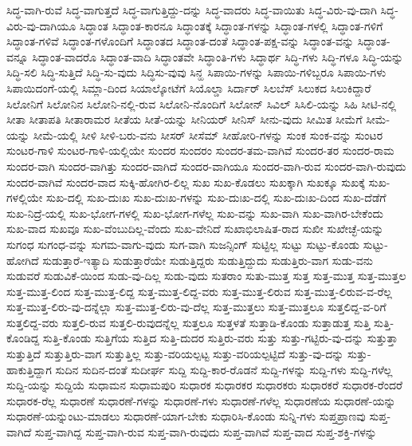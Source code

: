 {ಸಿದ್ಧ-ವಾಗಿ-ರುವೆ
ಸಿದ್ಧ-ವಾಗುತ್ತದೆ
ಸಿದ್ಧ-ವಾಗುತ್ತಿದ್ದು-ದನ್ನು
ಸಿದ್ಧ-ವಾದರು
ಸಿದ್ಧ-ವಾಯಿತು
ಸಿದ್ಧ-ವಿರು-ವು-ದಾಗಿ
ಸಿದ್ಧ-ವಿರು-ವು-ದಾಗಿಯೂ
ಸಿದ್ಧಾಂತ
ಸಿದ್ಧಾಂತ-ಕಾರನೂ
ಸಿದ್ಧಾಂತಕ್ಕೆ
ಸಿದ್ಧಾಂತ-ಗಳನ್ನು
ಸಿದ್ಧಾಂತ-ಗಳಲ್ಲಿ
ಸಿದ್ಧಾಂತ-ಗಳಿಗೆ
ಸಿದ್ಧಾಂತ-ಗಳಿವೆ
ಸಿದ್ಧಾಂತ-ಗಳೊಂದಿಗೆ
ಸಿದ್ಧಾಂತದ
ಸಿದ್ಧಾಂತ-ದಂತೆ
ಸಿದ್ಧಾಂತ-ಪಕ್ಷ-ವನ್ನು
ಸಿದ್ಧಾಂತ-ವನ್ನು
ಸಿದ್ಧಾಂತ-ವನ್ನೂ
ಸಿದ್ಧಾಂತ-ವಾದರೊ
ಸಿದ್ಧಾಂತ-ವಾದಿ
ಸಿದ್ಧಾಂತವೇ
ಸಿದ್ಧಾಂತಿ-ಗಳು
ಸಿದ್ಧಾರ್ಥ
ಸಿದ್ಧಿ-ಗಳು
ಸಿದ್ಧಿ-ಗಳೂ
ಸಿದ್ಧಿ-ಯನ್ನು
ಸಿದ್ಧಿ-ಸಲಿ
ಸಿದ್ಧಿ-ಸುತ್ತಿದೆ
ಸಿದ್ಧಿ-ಸು-ವುದು
ಸಿದ್ಧಿಸು-ವುವು
ಸಿನ್ಹ
ಸಿಪಾಯಿ-ಗಳನ್ನು
ಸಿಪಾಯಿ-ಗಳಿಬ್ಬರೂ
ಸಿಪಾಯಿ-ಗಳು
ಸಿಪಾಯಿದಂಗೆ-ಯಲ್ಲಿ
ಸಿಮ್ಲಾ-ದಿಂದ
ಸಿಯಾಲ್ಕೋಟೆಗೆ
ಸಿಯೊಲ್ಡಾ
ಸಿರ್ದಾರ್
ಸಿಲಬೆಸ್
ಸಿಲುಕದ
ಸಿಲುಕಿದ್ದಾರೆ
ಸಿಲೋನಿಗೆ
ಸಿಲೋನಿನ
ಸಿಲೋನಿ-ನಲ್ಲಿ-ರುವ
ಸಿಲೋನಿ-ನೊಂದಿಗೆ
ಸಿಲೋನ್
ಸಿವಿಲ್
ಸಿಸಿಲಿ-ಯನ್ನು
ಸಿಹಿ
ಸೀಟಿ-ನಲ್ಲಿ
ಸೀತಾ
ಸೀತಾಪತಿ
ಸೀತಾರಾಮರ
ಸೀತೆಯ
ಸೀತೆ-ಯನ್ನು
ಸೀನಿಯರ್
ಸೀನಿಸ್
ಸೀನು-ವುದು
ಸೀಮಿತ
ಸೀಮೆಗೆ
ಸೀಮೆ-ಯನ್ನು
ಸೀಮೆ-ಯಲ್ಲಿ
ಸೀಳಿ
ಸೀಳಿ-ಬರು-ವನು
ಸೀಸರ್
ಸೀಸೆಮ್
ಸೀಹೋರಿ-ಗಳನ್ನು
ಸುಂಕ
ಸುಂಕ-ವನ್ನು
ಸುಂಟರ
ಸುಂಟರ-ಗಾಳಿ
ಸುಂಟರ-ಗಾಳಿ-ಯಲ್ಲಿಯೇ
ಸುಂದರ
ಸುಂದರಂ
ಸುಂದರ-ತಮ-ವಾಗಿವೆ
ಸುಂದರ-ತರ
ಸುಂದರ-ರಾಮ
ಸುಂದರ-ವಾಗಿ
ಸುಂದರ-ವಾಗಿತ್ತು
ಸುಂದರ-ವಾಗಿದೆ
ಸುಂದರ-ವಾಗಿಯೂ
ಸುಂದರ-ವಾಗಿ-ರುವ
ಸುಂದರ-ವಾಗಿ-ರುವುದು
ಸುಂದರ-ವಾಗಿವೆ
ಸುಂದರ-ವಾದ
ಸುಕ್ಕಿ-ಹೋಗಿರ-ಲಿಲ್ಲ
ಸುಖ
ಸುಖ-ಕೊಡಲು
ಸುಖಕ್ಕಾಗಿ
ಸುಖಕ್ಕೂ
ಸುಖಕ್ಕೆ
ಸುಖ-ಗಳಲ್ಲಿಯೇ
ಸುಖ-ದಲ್ಲಿ
ಸುಖ-ದುಃಖ
ಸುಖ-ದುಃಖ-ಗಳನ್ನು
ಸುಖ-ದುಃಖ-ದಲ್ಲಿ
ಸುಖ-ದುಃಖ-ದಿಂದ
ಸುಖ-ದೆಡೆಗೆ
ಸುಖ-ನಿದ್ರೆ-ಯಲ್ಲಿ
ಸುಖ-ಭೋಗ-ಗಳಲ್ಲಿ
ಸುಖ-ಭೋಗ-ಗಳೆಲ್ಲ
ಸುಖ-ವನ್ನು
ಸುಖ-ವಾಗಿ
ಸುಖ-ವಾಗಿರ-ಬೇಕೆಂದು
ಸುಖ-ವಾದ
ಸುಖವೂ
ಸುಖ-ವೆಂಬುದಿಲ್ಲ-ವೆಂದು
ಸುಖ-ವೇನಿದೆ
ಸುಖಾಭಿಲಾಷಿತ-ರಾದ
ಸುಖೀ
ಸುಖೇಚ್ಛೆ-ಯನ್ನು
ಸುಗಂಧ
ಸುಗಂಧ-ವನ್ನು
ಸುಗಮ-ವಾಗು-ವುದು
ಸುಗ-ವಾಗಿ
ಸುಜನ್ಸಿಂಗ್
ಸುಟ್ಟಿಲ್ಲ
ಸುಟ್ಟು
ಸುಟ್ಟು-ಕೊಂಡು
ಸುಟ್ಟು-ಹೋಗಿದೆ
ಸುಡುತ್ತಾರೆ-ಇತ್ಯಾದಿ
ಸುಡುತ್ತಾರೆಯೇ
ಸುಡುತ್ತಿದ್ದರು
ಸುಡುತ್ತಿದ್ದುದು
ಸುಡುತ್ತಿರು-ವಾಗ
ಸುಡು-ವನು
ಸುಡುವರೆ
ಸುಡುವಿಕೆ-ಯಿಂದ
ಸುಡು-ವು-ದಿಲ್ಲ
ಸುಡು-ವುದು
ಸುತರಾಂ
ಸುತು-ಮುತ್ತ
ಸುತ್ತ
ಸುತ್ತ-ಮುತ್ತ
ಸುತ್ತ-ಮುತ್ತಲ
ಸುತ್ತ-ಮುತ್ತ-ಲಿಂದ
ಸುತ್ತ-ಮುತ್ತ-ಲಿದ್ದ
ಸುತ್ತ-ಮುತ್ತ-ಲಿದ್ದ-ವರು
ಸುತ್ತ-ಮುತ್ತ-ಲಿರುವ
ಸುತ್ತ-ಮುತ್ತ-ಲಿರುವ-ವ-ರೆಲ್ಲ
ಸುತ್ತ-ಮುತ್ತ-ಲಿರು-ವು-ದನ್ನೆಲ್ಲಾ
ಸುತ್ತ-ಮುತ್ತ-ಲಿರು-ವು-ದೆಲ್ಲ
ಸುತ್ತ-ಮುತ್ತಲು
ಸುತ್ತ-ಮುತ್ತಲೂ
ಸುತ್ತಲಿದ್ದ-ವ-ರಿಗೆ
ಸುತ್ತಲಿದ್ದ-ವರು
ಸುತ್ತಲಿ-ರುವ
ಸುತ್ತಲಿ-ರುವುದನ್ನೆಲ್ಲ
ಸುತ್ತಲೂ
ಸುತ್ತಳತೆ
ಸುತ್ತಾಡಿ-ಕೊಂಡು
ಸುತ್ತಾಡುತ್ತ
ಸುತ್ತಿ
ಸುತ್ತಿ-ಕೊಂಡಿದ್ದ
ಸುತ್ತಿ-ಕೊಂಡು
ಸುತ್ತಿಗೆಯ
ಸುತ್ತಿದ
ಸುತ್ತಿ-ದುದರ
ಸುತ್ತಿರು-ವರು
ಸುತ್ತು
ಸುತ್ತು-ಗಟ್ಟಿರು-ವು-ದನ್ನು
ಸುತ್ತುತ್ತಾ
ಸುತ್ತುತ್ತಿದೆ
ಸುತ್ತುತ್ತಿರು-ವಾಗ
ಸುತ್ತುತ್ತಿಲ್ಲ
ಸುತ್ತು-ವರಿಯಲ್ಪಟ್ಟ
ಸುತ್ತು-ವರಿಯಲ್ಪಟ್ಟಿದೆ
ಸುತ್ತು-ವು-ದನ್ನು
ಸುತ್ತು-ಹಾಕುತ್ತಿದ್ದಾಗ
ಸುದಿನ
ಸುದಿನ-ದಂತೆ
ಸುದೀರ್ಘ
ಸುದ್ದಿ
ಸುದ್ದಿ-ಕಾರ-ರೊಡನೆ
ಸುದ್ದಿ-ಗಳನ್ನು
ಸುದ್ದಿ-ಗಳು
ಸುದ್ದಿ-ಗಳೆಲ್ಲ
ಸುದ್ದಿ-ಯನ್ನು
ಸುದ್ದಿಯೆ
ಸುಧಾಮನ
ಸುಧಾಮಪುರಿ
ಸುಧಾರಕ
ಸುಧಾರಕರ
ಸುಧಾರಕರು
ಸುಧಾರಕರೆ
ಸುಧಾರಕ-ರೆಂದರೆ
ಸುಧಾರಕ-ರೆಲ್ಲ
ಸುಧಾರಣೆ
ಸುಧಾರಣೆ-ಗಳನ್ನು
ಸುಧಾರಣೆ-ಗಳು
ಸುಧಾರಣೆ-ಗಳೆಲ್ಲ
ಸುಧಾರಣೆಯ
ಸುಧಾರಣೆ-ಯನ್ನು
ಸುಧಾರಣೆ-ಯನ್ನುಂಟು-ಮಾಡಲು
ಸುಧಾರಣೆ-ಯಾಗ-ಬೇಕು
ಸುಧಾರಿಸಿ-ಕೊಂಡು
ಸುನ್ನಿ-ಗಳು
ಸುಪ್ತಪ್ರಾಣವು
ಸುಪ್ತ-ವಾಗಿದೆ
ಸುಪ್ತ-ವಾಗಿದ್ದ
ಸುಪ್ತ-ವಾಗಿ-ರುವ
ಸುಪ್ತ-ವಾಗಿ-ರುವುದು
ಸುಪ್ತ-ವಾಗಿವೆ
ಸುಪ್ತ-ವಾದ
ಸುಪ್ತ-ಶಕ್ತಿ-ಗಳನ್ನು
}
